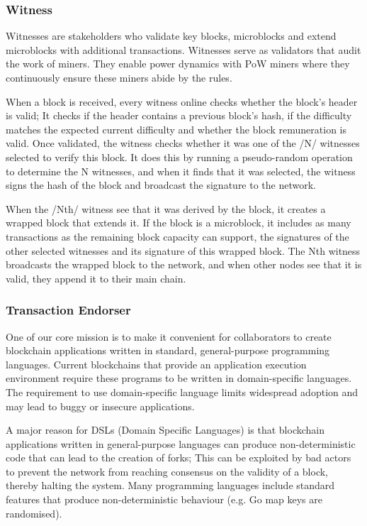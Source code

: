 \subsubsection{Witness}
Witnesses are stakeholders who validate key blocks, microblocks and extend microblocks with additional transactions. Witnesses serve as validators that audit the work of miners. They enable power dynamics with PoW miners where they continuously ensure these miners abide by the rules.

When a block is received, every witness online checks whether the block’s header is valid; It checks if the header contains a previous block’s hash, if the difficulty matches the expected current difficulty and whether the block remuneration is valid. Once validated, the witness checks whether it was one of the /N/ witnesses selected to verify this block. It does this by running a pseudo-random operation to determine the N witnesses, and when it finds that it was selected, the witness signs the hash of the block and broadcast the signature to the network.

When the /Nth/ witness see that it was derived by the block, it creates a wrapped block that extends it. If the block is a microblock, it includes as many transactions as the remaining block capacity can support, the signatures of the other selected witnesses and its signature of this wrapped block. The Nth witness broadcasts the wrapped block to the network, and when other nodes see that it is valid, they append it to their main chain.


\subsubsection{Transaction Endorser}
One of our core mission is to make it convenient for collaborators to create blockchain applications written in standard, general-purpose programming languages. Current blockchains that provide an application execution environment require these programs to be written in domain-specific languages. The requirement to use domain-specific language limits widespread adoption and may lead to buggy or insecure applications.

A major reason for DSLs (Domain Specific Languages) is that blockchain applications written in general-purpose languages can produce non-deterministic code that can lead to the creation of forks; This can be exploited by bad actors to prevent the network from reaching consensus on the validity of a block, thereby halting the system. Many programming languages include standard features that produce non-deterministic behaviour (e.g. Go map keys are randomised).

